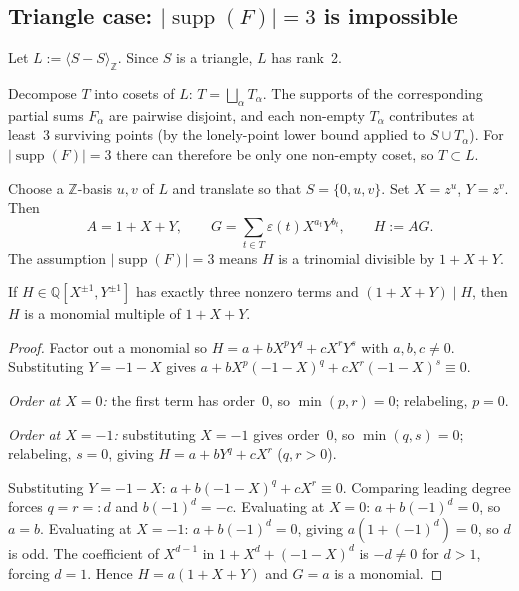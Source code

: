 
\subsection*{Triangle case: \(|\operatorname{supp}(F)|=3\) is impossible}

Let \(L:=\langle S-S\rangle_{\mathbb{Z}}\).  Since \(S\) is a triangle, \(L\) has rank~2.

Decompose \(T\) into cosets of \(L\): \(T=\bigsqcup_\alpha T_\alpha\).  The supports of the
corresponding partial sums \(F_\alpha\) are pairwise disjoint, and each non-empty \(T_\alpha\)
contributes at least~3 surviving points (by the lonely-point lower bound applied to
\(S\cup T_\alpha\)).  For \(|\operatorname{supp}(F)|=3\) there can therefore be only one
non-empty coset, so \(T\subset L\).

Choose a \(\mathbb{Z}\)-basis \(u,v\) of \(L\) and translate so that \(S=\{0,u,v\}\).
Set \(X=z^u\), \(Y=z^v\). Then
\[
A=1+X+Y,\qquad G=\sum_{t\in T}\varepsilon(t)X^{a_t}Y^{b_t},\qquad H:=AG.
\]
The assumption \(|\operatorname{supp}(F)|=3\) means \(H\) is a trinomial divisible by \(1+X+Y\).

\begin{lemma}
If \(H\in\mathbb{Q}[X^{\pm1},Y^{\pm1}]\) has exactly three nonzero terms and \((1+X+Y)\mid H\),
then \(H\) is a monomial multiple of \(1+X+Y\).
\end{lemma}

\begin{proof}
Factor out a monomial so \(H=a+bX^pY^q+cX^rY^s\) with \(a,b,c\neq0\).
Substituting \(Y=-1-X\) gives \(a+bX^p(-1-X)^q+cX^r(-1-X)^s\equiv0\).

\emph{Order at \(X=0\):} the first term has order~0, so \(\min(p,r)=0\); relabeling, \(p=0\).

\emph{Order at \(X=-1\):} substituting \(X=-1\) gives order~0, so \(\min(q,s)=0\); relabeling,
\(s=0\), giving \(H=a+bY^q+cX^r\) (\(q,r>0\)).

Substituting \(Y=-1-X\): \(a+b(-1-X)^q+cX^r\equiv0\).
Comparing leading degree forces \(q=r=:d\) and \(b(-1)^d=-c\).
Evaluating at \(X=0\): \(a+b(-1)^d=0\), so \(a=b\).
Evaluating at \(X=-1\): \(a+b(-1)^d=0\), giving \(a(1+(-1)^d)=0\), so \(d\) is odd.
The coefficient of \(X^{d-1}\) in \(1+X^d+(-1-X)^d\) is \(-d\neq0\) for \(d>1\),
forcing \(d=1\).  Hence \(H=a(1+X+Y)\) and \(G=a\) is a monomial.
\end{proof}

